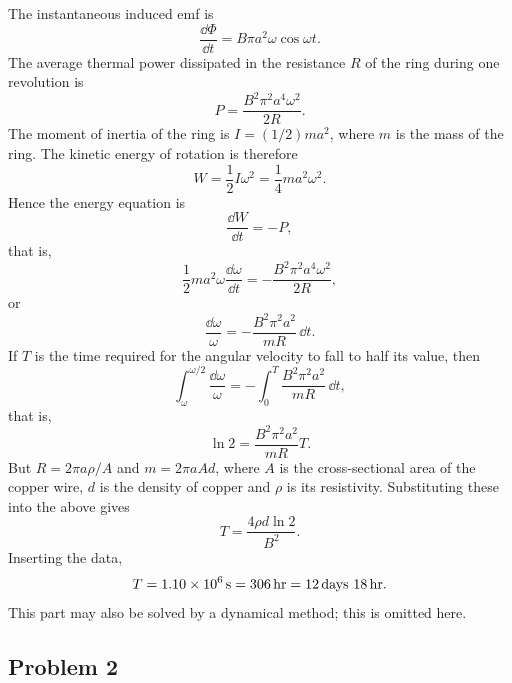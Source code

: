 The instantaneous induced emf is
\begin{equation*}
\frac{\dd\Phi}{\dd t}=B\pi a^2\omega\cos\omega t .
\end{equation*}
The average thermal power dissipated in the resistance $R$ of the ring during one revolution is
\begin{equation*}
P=\frac{B^2\pi^2a^4\omega^2}{2R} .
\end{equation*}
The moment of inertia of the ring is $I=(1/2)ma^2$, where $m$ is the mass of the ring. The kinetic energy of rotation is therefore
\begin{equation*}
W=\frac{1}{2}I\omega^2=\frac{1}{4}ma^2\omega^2 .
\end{equation*}
Hence the energy equation is
\begin{equation*}
\frac{\dd W}{\dd t}=-P ,
\end{equation*}
that is,
\begin{equation*}
\frac{1}{2}ma^2\omega\frac{\dd\omega}{\dd t}
=-\frac{B^2\pi^2a^4\omega^2}{2R} ,
\end{equation*}
or
\begin{equation*}
\frac{\dd\omega}{\omega}=-\frac{B^2\pi^2a^2}{mR}\,\dd t .
\end{equation*}
If $T$ is the time required for the angular velocity to fall to half its value, then
\begin{equation*}
\int_\omega^{\omega/2}\frac{\dd\omega}{\omega}
=-\int_0^T\frac{B^2\pi^2a^2}{mR}\,\dd t ,
\end{equation*}
that is,
\begin{equation*}
\ln2=\frac{B^2\pi^2a^2}{mR}T .
\end{equation*}
But $R=2\pi a\rho/A$ and $m=2\pi aAd$, where $A$ is the cross-sectional area of the copper wire, $d$ is the density of copper and $\rho$ is its resistivity. Substituting these into the above gives
\begin{equation*}
T=\frac{4\rho d\ln2}{B^2} .
\end{equation*}
Inserting the data,
\begin{equation*}
T=1.10\times10^6\unitv{s}=306\unitv{hr}=12\unitv{days}\ 18\unitv{hr} .
\end{equation*}
This part may also be solved by a dynamical method; this is omitted here.

\subsection*{Problem 2}

